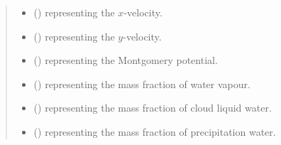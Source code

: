 \documentclass[letterpaper,10pt,english]{sphinxmanual}
\begin{document}
\begin{fulllineitems}
\begin{fulllineitems}
\begin{quote}
\begin{description}
\begin{itemize}
\item {} 
 () \textendash{}  representing the \(x\)-velocity.

\item {} 
 () \textendash{}  representing the \(y\)-velocity.

\item {} 
 () \textendash{}  representing the Montgomery potential.

\item {} 
 () \textendash{}  representing the mass fraction of water vapour.

\item {} 
 () \textendash{}  representing the mass fraction of cloud liquid water.

\item {} 
 () \textendash{}  representing the mass fraction of precipitation water.

\end{itemize}

\end{description}\end{quote}

\end{fulllineitems}



\end{fulllineitems}
\end{document}
